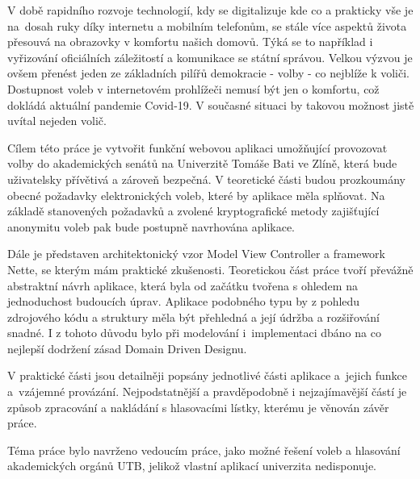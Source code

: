 
V době rapidního rozvoje technologií, kdy se digitalizuje kde co a prakticky vše je na~dosah ruky díky internetu a mobilním telefonům, se stále více aspektů života přesouvá na obrazovky v komfortu našich domovů. Týká se to například i vyřizování oficiálních záležitostí a komunikace se státní správou. Velkou výzvou je ovšem přenést jeden ze základních pilířů demokracie - volby - co nejblíže k voliči. Dostupnost voleb v internetovém prohlížeči nemusí být jen o komfortu, což dokládá aktuální pandemie Covid-19. V současné situaci by takovou možnost jistě uvítal nejeden volič.

\bigskip

Cílem této práce je vytvořit funkční webovou aplikaci umožňující provozovat volby do akademických senátů na Univerzitě Tomáše Bati ve Zlíně, která bude uživatelsky přívětivá a zároveň bezpečná. V teoretické části budou prozkoumány obecné požadavky elektronických voleb, které by aplikace měla splňovat. Na základě stanovených požadavků a zvolené kryptografické metody zajišťující anonymitu voleb pak bude postupně navrhována aplikace.

Dále je představen architektonický vzor Model View Controller a framework Nette, se kterým mám praktické zkušenosti. Teoretickou část práce tvoří převážně abstraktní návrh aplikace, která byla od začátku tvořena s ohledem na jednoduchost budoucích úprav. Aplikace podobného typu by z pohledu zdrojového kódu a struktury měla být přehledná a její údržba a rozšiřování snadné. I z tohoto důvodu bylo při modelování i~implementaci dbáno na co nejlepší dodržení zásad Domain Driven Designu.

\bigskip

V praktické části jsou detailněji popsány jednotlivé části aplikace a~jejich funkce a~vzájemné provázání. Nejpodstatnější a pravděpodobně i nejzajímavější částí je způsob zpracování a nakládání s hlasovacími lístky, kterému je věnován závěr práce.

Téma práce bylo navrženo vedoucím práce, jako možné řešení voleb a hlasování akademických orgánů UTB, jelikož vlastní aplikací univerzita nedisponuje.


